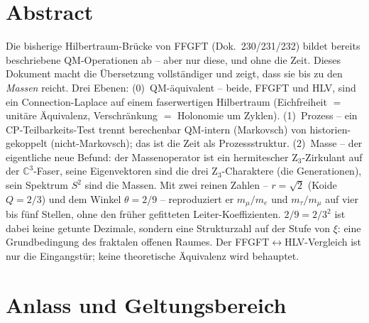 
\section*{Abstract}
Die bisherige Hilbertraum-Brücke von FFGFT (Dok.~230/231/232) bildet bereits
beschriebene QM-Operationen ab -- aber nur diese, und ohne die Zeit. Dieses
Dokument macht die Übersetzung vollständiger und zeigt, dass sie bis zu den
\emph{Massen} reicht. Drei Ebenen: (0)~QM-äquivalent -- beide, FFGFT und HLV,
sind ein Connection-Laplace auf einem faserwertigen Hilbertraum (Eichfreiheit
$=$ unitäre Äquivalenz, Verschränkung $=$ Holonomie um Zyklen). (1)~Prozess --
ein CP-Teilbarkeits-Test trennt berechenbar QM-intern (Markovsch) von
historien-gekoppelt (nicht-Markovsch); das ist die Zeit als Prozessstruktur.
(2)~Masse -- der eigentliche neue Befund: der Massenoperator ist ein
hermitescher Z$_3$-Zirkulant auf der $\mathbb{C}^3$-Faser, seine Eigenvektoren
sind die drei Z$_3$-Charaktere (die Generationen), sein Spektrum $S^2$ sind die
Massen. Mit zwei reinen Zahlen -- $r=\sqrt2$ (Koide $Q=2/3$) und dem Winkel
$\theta=2/9$ -- reproduziert er $m_\mu/m_e$ und $m_\tau/m_\mu$ auf vier bis
fünf Stellen, ohne den früher gefitteten Leiter-Koeffizienten. $2/9=2/3^2$ ist
dabei keine getunte Dezimale, sondern eine Strukturzahl auf der Stufe von
$\xi$: eine Grundbedingung des fraktalen offenen Raumes. Der FFGFT$\leftrightarrow$HLV-Vergleich
ist nur die Eingangstür; keine theoretische Äquivalenz wird behauptet.

\section{Anlass und Geltungsbereich}

